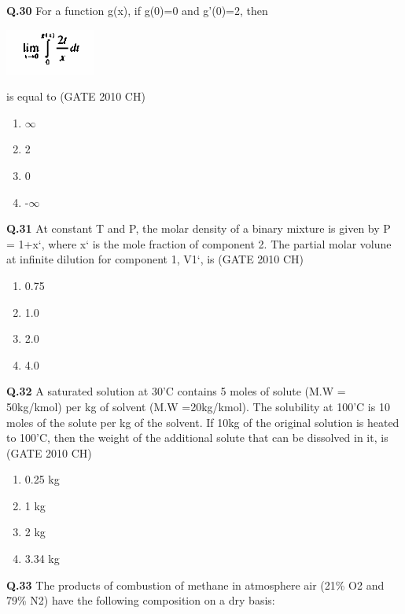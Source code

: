 \documentclass[journal,12pt,onecolumn]{exam}
\theoremstyle{remark}
\begin{document}
 \noindent
 \textbf{Q.30}
   For a function g(x), if g(0)=0 and g'(0)=2, then

\includegraphics[width=0.25\linewidth]{images/Q.30 image.png}
   
   
    is equal to
\hfill{(GATE 2010 CH)}\\

\begin{enumerate}
    \item $\infty$
    \item 2
    \item 0
    \item -$\infty$
\end{enumerate}

\noindent
\textbf{Q.31}
 At constant T and P, the molar density of a binary mixture is given by P = 1+x`, where x` is the mole fraction of component 2. The partial molar volune at infinite dilution for component 1, V1`, is
 \hfill{(GATE 2010 CH)}\\

 \begin{enumerate}
     \item 0.75
     \item 1.0
     \item 2.0
     \item 4.0
 \end{enumerate}
 

\noindent
\textbf{Q.32}
 A saturated solution at 30'C contains 5 moles of solute (M.W = 50kg/kmol) per kg of solvent (M.W =20kg/kmol). The solubility at 100'C is 10 moles of the solute per kg of the solvent. If 10kg of the original solution is heated to 100'C, then the weight of the additional solute that can be dissolved in it, is
 \hfill{(GATE 2010 CH)}\\

 \begin{enumerate}
     \item 0.25 kg
     \item 1 kg
     \item 2 kg
     \item 3.34 kg
     
 \end{enumerate}

 \noindent
 \textbf{Q.33}
  The products of combustion of methane in atmosphere air (21\% O2 and  79\% N2) have the following composition on a dry basis:
  
\end{document}
